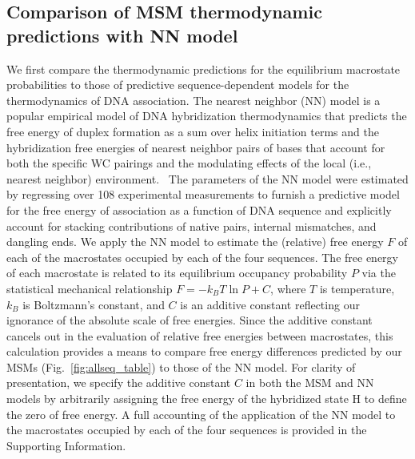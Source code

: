 \documentclass[journal=jpcbfk,manuscript=article]{achemso}
\newcommand*{\blauw}[1]{{#1}}
\begin{document}
\subsection{Comparison of MSM thermodynamic predictions with NN model} \label{sec:NN}

We first compare the thermodynamic predictions for the equilibrium macrostate probabilities to those of predictive sequence-dependent models for the thermodynamics of DNA association. The nearest neighbor (NN) model is a popular empirical model of DNA hybridization thermodynamics that predicts the free energy of duplex formation as a sum over helix initiation terms and the hybridization free energies of nearest neighbor pairs of bases that account for both the specific WC pairings and the modulating effects of the local (i.e., nearest neighbor) environment.~\citep{SantaLucia1998AThermodynamics, Santalucia2004TheMotifs} The parameters of the NN model were estimated by regressing over 108 experimental measurements to furnish a predictive model for the free energy of association as a function of DNA sequence and explicitly account for stacking contributions of native pairs, internal mismatches, and dangling ends. We apply the NN model to estimate the (relative) free energy $F$ of each of the macrostates occupied by each of the four sequences. The free energy of each macrostate is related to its equilibrium occupancy probability $P$ via the statistical mechanical relationship $F = -k_B T \ln P + C$, where $T$ is temperature, $k_B$ is Boltzmann's constant, and $C$ is an additive constant reflecting our ignorance of the absolute scale of free energies. Since the additive constant cancels out in the evaluation of relative free energies between macrostates, this calculation provides a means to compare free energy differences predicted by our MSMs (Fig.~\ref{fig:allseq_table}) to those of the NN model. For clarity of presentation, we specify the additive constant $C$ in both the MSM and NN models by arbitrarily assigning the free energy of the hybridized state H to define the zero of free energy. A full accounting of the application of the NN model to the macrostates occupied by each of the four sequences is provided in the \blauw{Supporting Information}.
\end{document}
